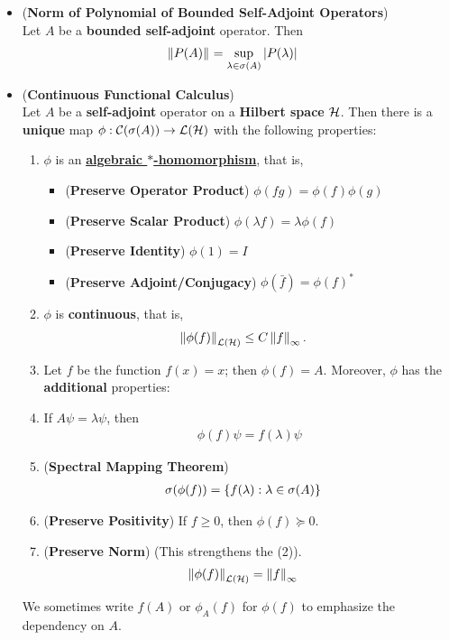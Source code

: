 \documentclass[11pt]{article}
\begin{document}
\begin{itemize}
\item \begin{lemma}  (\textbf{Norm of Polynomial of Bounded Self-Adjoint Operators}) \citep{reed1980methods}\\
Let $A$ be a \textbf{bounded self-adjoint} operator. Then 
\begin{align*}
\left\|P(A)\right\|_{} &= \sup_{\lambda\in \sigma(A)} \left\lvert P(\lambda) \right\rvert
\end{align*}
\end{lemma}

\item \begin{theorem} (\textbf{Continuous Functional Calculus}) \citep{reed1980methods}\\
Let $A$ be a \textbf{self-adjoint}  operator on a \textbf{Hilbert space} ${\mathcal H}$. Then there is a \textbf{unique} map $\phi: {\mathcal C}(\sigma(A)) \to {\mathcal L}({\mathcal H})$ with the following properties: 
\begin{enumerate}
\item $\phi$ is an \underline{\textbf{algebraic $*$-homomorphism}}, that is, 
\begin{itemize}
\item (\textbf{Preserve Operator Product}) $\phi(fg) = \phi(f)\phi(g)$
\item (\textbf{Preserve Scalar Product}) $\phi(\lambda f) = \lambda \phi(f)$
\item (\textbf{Preserve Identity}) $\phi(1) = I$
\item (\textbf{Preserve Adjoint/Conjugacy}) $\phi(\bar{f}) =  \phi(f)^{*}$
\end{itemize}
\item $\phi$ is \textbf{continuous}, that is, 
\begin{align*}
\left\|\phi(f)\right\|_{{\mathcal L}({\mathcal H})} &\le C \left\|f\right\|_{\infty}.
\end{align*}
\item Let $f$ be the function $f(x) = x$; then $\phi(f) = A$. 
Moreover,  $\phi$ has the \textbf{additional} properties: 
\item  If $A\psi = \lambda \psi$, then 
\begin{align}
\phi(f)\psi  = f(\lambda) \psi  \label{eqn: cont_functional_calculas_spectral_decomp}
\end{align}
\item (\textbf{Spectral Mapping Theorem}) 
\begin{align}
\sigma(\phi(f)) &= \left\{f(\lambda): \lambda \in \sigma(A)\right\} \label{eqn: cont_functional_calculas_spectrum_mapping}
\end{align}
\item (\textbf{Preserve Positivity})  If $f \ge 0$, then $\phi(f) \succeq 0$. 
\item (\textbf{Preserve Norm}) (This strengthens the (2)).
\begin{align}
\left\|\phi(f)\right\|_{{\mathcal L}({\mathcal H})} &= \left\|f\right\|_{\infty} \label{eqn: cont_functional_calculas_norm_preserve}
\end{align}
\end{enumerate} We sometimes write $f(A)$ or $\phi_{A}(f)$ for $\phi(f)$ to emphasize the dependency on $A$.
\end{theorem}


\end{itemize}
\end{document}
